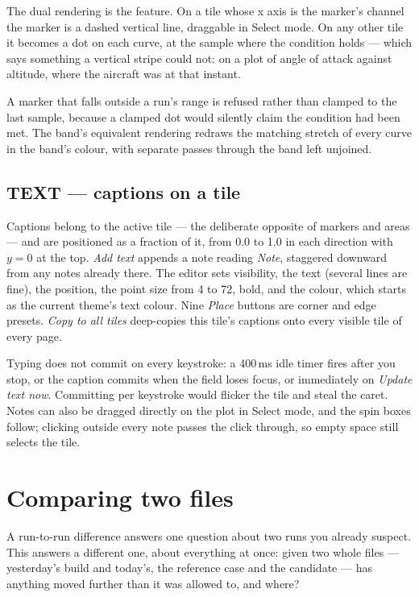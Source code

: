 \documentclass[11pt,a4paper,oneside]{report}
\begin{document}
The dual rendering is the feature. On a tile whose x axis is the marker's channel
the marker is a dashed vertical line, draggable in Select mode. On any other tile
it becomes a dot on each curve, at the sample where the condition holds --- which
says something a vertical stripe could not: on a plot of angle of attack against
altitude, where the aircraft was at that instant.

A marker that falls outside a run's range is refused rather than clamped to the
last sample, because a clamped dot would silently claim the condition had been
met. The band's equivalent rendering redraws the matching stretch of every curve
in the band's colour, with separate passes through the band left unjoined.

\section{TEXT --- captions on a tile}

Captions belong to the active tile --- the deliberate opposite of markers and
areas --- and are positioned as a fraction of it, from 0.0 to 1.0 in each
direction with $y = 0$ at the top. \emph{Add text} appends a note reading
\emph{Note}, staggered downward from any notes already there. The editor sets
visibility, the text (several lines are fine), the position, the point size from
4 to 72, bold, and the colour, which starts as the current theme's text colour.
Nine \emph{Place} buttons are corner and edge presets. \emph{Copy to all tiles}
deep-copies this tile's captions onto every visible tile of every page.

Typing does not commit on every keystroke: a 400\,ms idle timer fires after you
stop, or the caption commits when the field loses focus, or immediately on
\emph{Update text now}. Committing per keystroke would flicker the tile and
steal the caret. Notes can also be dragged directly on the plot in Select mode,
and the spin boxes follow; clicking outside every note passes the click through,
so empty space still selects the tile.

\chapter{Comparing two files}
\label{ch:compare}

A run-to-run difference answers one question about two runs you already
suspect. This answers a different one, about everything at once: given two
whole files --- yesterday's build and today's, the reference case and the
candidate --- has anything moved further than it was allowed to, and where?
\end{document}
